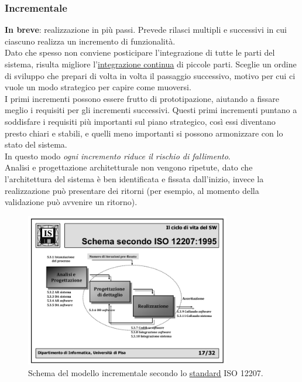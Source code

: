 			\subsubsection{Incrementale}  \label{mincrementale}
			\textbf{In breve}: realizzazione in più passi. Prevede rilasci multipli e successivi in cui ciascuno realizza un incremento di funzionalità. \\
			Dato che spesso non conviene posticipare l'integrazione di tutte le parti del sistema, risulta migliore l'\underline{\hyperref[integrazione]{integrazione continua}} di piccole parti.
			Sceglie un ordine di sviluppo che prepari di volta in volta il passaggio successivo, motivo per cui ci vuole un modo strategico per capire come muoversi. \\
			I primi incrementi possono essere frutto di prototipazione, aiutando a fissare meglio i requisiti per gli incrementi successivi.
			Questi primi incrementi puntano a soddisfare i requisiti più importanti sul piano strategico, così essi diventano presto chiari e stabili, e quelli meno importanti si possono armonizzare con lo stato del sistema. \\
			In questo modo \textit{ogni incremento riduce il rischio di fallimento}. \\
			Analisi e progettazione architetturale non vengono ripetute, dato che l'architettura del sistema è ben identificata e fissata dall'inizio, invece la realizzazione può presentare dei ritorni (per esempio, al momento della validazione può avvenire un ritorno).

			\begin{figure}[H]
				\centering
				\includegraphics[width=0.8\textwidth]{img/incrementale}
				\caption{Schema del modello incrementale secondo lo \underline{\hyperref[standard]{standard}} ISO 12207.}
			\end{figure}

